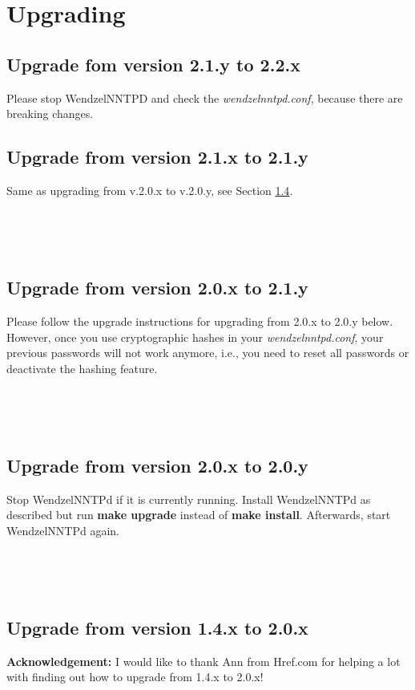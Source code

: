 \chapter{Upgrading}\label{Ch:Upgrade}

\section{Upgrade fom version 2.1.y to 2.2.x}

Please stop WendzelNNTPD and check the \textit{wendzelnntpd.conf}, because there are breaking changes.

\section{Upgrade from version 2.1.x to 2.1.y}

Same as upgrading from v.2.0.x to v.2.0.y, see Section \ref{20xto20y}.

~

~

\section{Upgrade from version 2.0.x to 2.1.y}

Please follow the upgrade instructions for upgrading from 2.0.x to 2.0.y below. However, once you use cryptographic hashes in your \textit{wendzelnntpd.conf}, your previous passwords will not work anymore, i.e., you need to reset all passwords or deactivate the hashing feature.

~

~

\section{Upgrade from version 2.0.x to 2.0.y}\label{20xto20y}

Stop WendzelNNTPd if it is currently running. Install WendzelNNTPd as described but run \textbf{make upgrade} instead of \textbf{make install}. Afterwards, start WendzelNNTPd again.

~

~

\section{Upgrade from version 1.4.x to 2.0.x}

\textbf{Acknowledgement:} I would like to thank Ann from Href.com for helping a lot with finding out how to upgrade from 1.4.x to 2.0.x!

